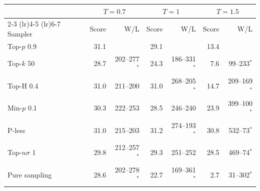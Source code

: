 \begin{tabular}{lrrrrrr}
\toprule
& \multicolumn{2}{c}{$T{=}0.7$} & \multicolumn{2}{c}{$T{=}1$} & \multicolumn{2}{c}{$T{=}1.5$} \\
\cmidrule(lr){2-3} \cmidrule(lr){4-5} \cmidrule(lr){6-7}
Sampler & Score & W/L & Score & W/L & Score & W/L \\
\midrule
Top-$p$ 0.9 & 31.1 &  & 29.1 &  & 13.4 &  \\
Top-$k$ 50 & 28.7 & 202--277$^{*}$ & 24.3 & 186--331$^{*}$ & 7.6 & 99--233$^{*}$ \\
Top-H 0.4 & 31.0 & 211--200 & 31.0 & 268--205$^{*}$ & 14.7 & 209--169$^{*}$ \\
Min-$p$ 0.1 & 30.3 & 222--253 & 28.5 & 246--240 & 23.9 & 399--100$^{*}$ \\
P-less & 31.0 & 215--203 & 31.2 & 274--193$^{*}$ & 30.8 & 532--73$^{*}$ \\
Top-$n\sigma$ 1 & 29.8 & 212--257$^{*}$ & 29.3 & 251--252 & 28.5 & 469--74$^{*}$ \\
Pure sampling & 28.6 & 202--278$^{*}$ & 22.7 & 169--361$^{*}$ & 2.7 & 31--302$^{*}$ \\
\bottomrule
\end{tabular}